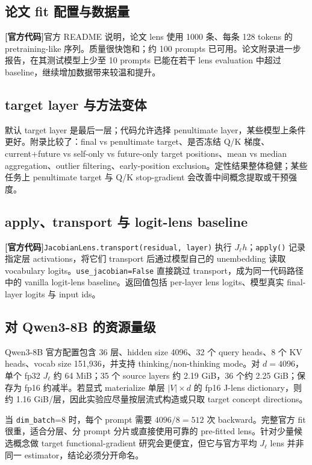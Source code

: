 \documentclass[10.5pt,a4paper]{ctexart}
\newcommand{\CodeTag}{\textbf{[官方代码]}}
\begin{document}
\subsection{论文 fit 配置与数据量}
\CodeTag 官方 README 说明，论文 lens 使用 1000 条、每条 128 tokens 的 pretraining-like 序列。质量很快饱和；约 100 prompts 已可用。论文附录进一步报告，在其测试模型上少至 10 prompts 已能在若干 lens evaluation 中超过 baseline，继续增加数据带来较温和提升。

\subsection{target layer 与方法变体}
默认 target layer 是最后一层；代码允许选择 penultimate layer，某些模型上条件更好。附录比较了：final vs penultimate target、是否冻结 Q/K 梯度、current+future vs self-only vs future-only target positions、mean vs median aggregation、outlier filtering、early-position exclusion。定性结果整体稳健；某些任务上 penultimate target 与 Q/K stop-gradient 会改善中间概念提取或干预强度。

\subsection{apply、transport 与 logit-lens baseline}
\CodeTag \texttt{JacobianLens.transport(residual, layer)} 执行 $J_\ell h$；\texttt{apply()} 记录指定层 activations，将它们 transport 后通过模型自己的 unembedding 读取 vocabulary logits。\texttt{use\_jacobian=False} 直接跳过 transport，成为同一代码路径中的 vanilla logit-lens baseline。返回值包括 per-layer lens logits、模型真实 final-layer logits 与 input ids。

\subsection{对 Qwen3-8B 的资源量级}
Qwen3-8B 官方配置包含 36 层、hidden size 4096、32 个 query heads、8 个 KV heads、vocab size 151,936，并支持 thinking/non-thinking mode。对 $d=4096$，单个 fp32 $J_\ell$ 约 64 MiB；35 个 source layers 约 2.19 GiB，36 个约 2.25 GiB；保存为 fp16 约减半。若显式 materialize 单层 $|V|\times d$ 的 fp16 J-lens dictionary，则约 1.16 GiB/层，因此实验应尽量按层流式构造或只取 target concept directions。

当 \texttt{dim\_batch}=8 时，每个 prompt 需要 $4096/8=512$ 次 backward。完整官方 fit 很重，适合分层、分 prompt 分片或直接使用可靠的 pre-fitted lens。针对少量候选概念做 target functional-gradient 研究会更便宜，但它与官方平均 $J_\ell$ lens 并非同一 estimator，结论必须分开命名。
\end{document}
